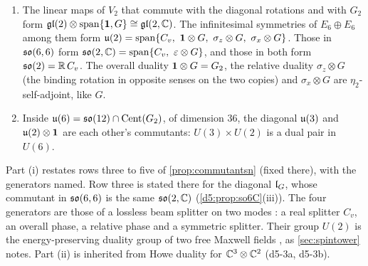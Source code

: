 \begin{proposition}
\label{d5:prop:energysym}
\begin{enumerate}[label=(\roman*),leftmargin=2.2em]
\item The linear maps of $V_2$ that commute with the diagonal rotations and with $G_2$ form $\mathfrak{gl}(2)\otimes\operatorname{span}\{\mathbf 1,G\}\cong\mathfrak{gl}(2,\mathbb{C})$.
The infinitesimal symmetries of $E_6\oplus E_6$ among them form $\uu2=\operatorname{span}\{C_v,\ \id\otimes G,\ \sigma_z\otimes G,\ \sigma_x\otimes G\}$. Those
in $\mathfrak{so}(6,6)$ form $\so{2,\C}=\operatorname{span}\{C_v,\ \varepsilon\otimes G\}$, and those in both form $\mathfrak{so}(2)=\mathbb{R}\,C_v$. The overall duality $\mathbf 1\otimes G=G_2$, the
relative duality $\sigma_z\otimes G$ (the binding rotation in opposite senses on the two copies) and $\sigma_x\otimes G$ are $\eta_2$-self-adjoint,
like $G$.
\item Inside $\mathfrak{u}(6)=\mathfrak{so}(12)\cap\operatorname{Cent}(G_2)$, of dimension $36$, the diagonal $\mathfrak{u}(3)$ and $\mathfrak{u}(2)\otimes\mathbf 1$ are each other's commutants: $U(3)\times U(2)$ is
a dual pair in $U(6)$.
\end{enumerate}
\end{proposition}

Part (i) restates rows three to five of \cref{prop:commutantsn} (fixed there), with the generators named. Row three is stated there for the diagonal $\mathfrak l_G$, whose commutant in $\mathfrak{so}(6,6)$ is the same $\mathfrak{so}(2,\mathbb{C})$ (\cref{d5:prop:so6C}(iii)). The four generators are
those of a lossless beam splitter on two modes \cite{CamposSalehTeich89}: a real splitter $C_v$, an overall phase, a relative phase and a
symmetric splitter. Their group $U(2)$ is the energy-preserving duality group of two free Maxwell fields \cite{GaillardZumino81}, as
\cref{sec:spintower} notes. Part (ii) is inherited from Howe duality for $\mathbb{C}^3\otimes\mathbb{C}^2$ \cite{Howe89} (d5-3a, d5-3b).

